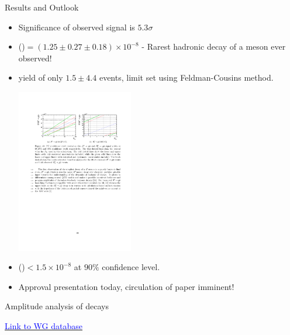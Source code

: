 \documentclass{beamer}
\begin{document}
\begin{frame}{Results and Outlook}
  \begin{itemize}
  \item Significance of observed \decay{\Bd}{\proton \antiproton} signal is $5.3\sigma$
  \item \BF(\decay{\Bd}{\proton \antiproton})$ = (1.25\pm0.27\pm0.18) \times 10^{-8}$ - Rarest hadronic decay of a \PB meson ever observed!
  \item \decay{\Bs}{\proton \antiproton} yield of only $1.5\pm4.4$ events, limit set using Feldman-Cousins method.
    \begin{center}
      \includegraphics[width=0.4\textwidth]{PPBarFC.pdf}
    \end{center}
  \item \BF(\decay{\Bs}{\proton \antiproton})$ < 1.5 \times 10^{-8} $ at $90\%$ confidence level.
  \item Approval presentation today, circulation of paper imminent!
  \end{itemize}
\end{frame}

\begin{frame}
  \begin{block}{}
    \centering Amplitude analysis of \Large \decay{\Bd}{(\pip \pim)(\Kp\pim)} decays
  \end{block}
  \centering \href{https://lhcb-wg.web.cern.ch/lhcb-WG/bnoc/listentry.py?name=2011\%2B12+B+-\%3E+K\%2A0+rho0+BF\&cat=analysis}{\textcolor{blue}{Link to WG database}}
\end{frame}
\end{document}
